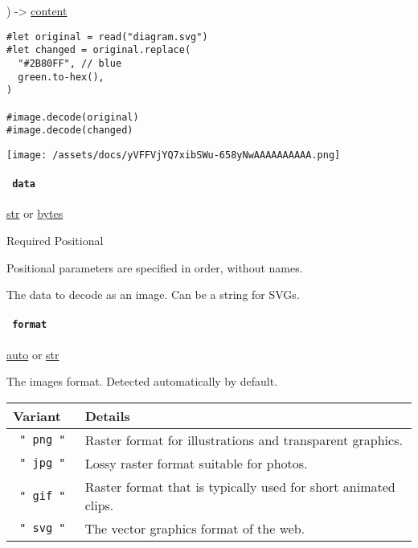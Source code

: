 ) -\textgreater{} \href{/docs/reference/foundations/content/}{content}

\begin{verbatim}
#let original = read("diagram.svg")
#let changed = original.replace(
  "#2B80FF", // blue
  green.to-hex(),
)

#image.decode(original)
#image.decode(changed)
\end{verbatim}

\texttt{[image: /assets/docs/yVFFVjYQ7xibSWu-658yNwAAAAAAAAAA.png]}

\paragraph{\texorpdfstring{\texttt{\ data\ }}{ data }}\label{definitions-decode-data}

\href{/docs/reference/foundations/str/}{str} {or}
\href{/docs/reference/foundations/bytes/}{bytes}

{Required} {{ Positional }}

\label{definitions-decode-data-positional-tooltip}
Positional parameters are specified in order, without names.

The data to decode as an image. Can be a string for SVGs.

\paragraph{\texorpdfstring{\texttt{\ format\ }}{ format }}\label{definitions-decode-format}

\href{/docs/reference/foundations/auto/}{auto} {or}
\href{/docs/reference/foundations/str/}{str}

The image\textquotesingle s format. Detected automatically by default.

\begin{longtable}[]{@{}ll@{}}
\toprule\noalign{}
Variant & Details \\
\midrule\noalign{}
\endhead
\bottomrule\noalign{}
\endlastfoot
\texttt{\ "\ png\ "\ } & Raster format for illustrations and transparent
graphics. \\
\texttt{\ "\ jpg\ "\ } & Lossy raster format suitable for photos. \\
\texttt{\ "\ gif\ "\ } & Raster format that is typically used for short
animated clips. \\
\texttt{\ "\ svg\ "\ } & The vector graphics format of the web. \\
\end{longtable}

